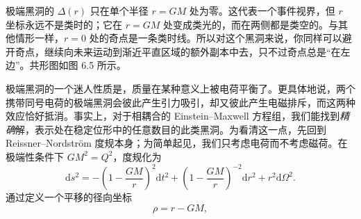 极端黑洞的 $\Delta(r)$ 只在单个半径 $r=GM$ 处为零。这代表一个事件视界，但 $r$ 坐标永远不是类时的；它在 $r=GM$ 处变成类光的，而在两侧都是类空的。与其他情形一样，$r=0$ 处的奇点是一条类时线。所以对这个黑洞来说，你同样可以避开奇点，继续向未来运动到渐近平直区域的额外副本中去，只不过奇点总是“在左边”。共形图如图 6.5 所示。

极端黑洞的一个迷人性质是，质量在某种意义上被电荷平衡了。更具体地说，两个携带同号电荷的极端黑洞会彼此产生引力吸引，却又彼此产生电磁排斥，而这两种效应恰好抵消。事实上，对于相耦合的 Einstein–Maxwell 方程组，我们能找到\emph{精确}解，表示处在稳定位形中的任意数目的此类黑洞。为看清这一点，先回到 Reissner–Nordström 度规本身；为简单起见，我们只考虑电荷而不考虑磁荷。在极端性条件下 $GM^{2}=Q^{2}$，度规化为
\begin{equation*}
\mathrm{d}s^{2} = -\left(1-\frac{GM}{r}\right)^{2}\mathrm{d}t^{2} + \left(1-\frac{GM}{r}\right)^{-2}\mathrm{d}r^{2} + r^{2}\mathrm{d}\Omega^{2}.
\tag{6.58}
\end{equation*}
通过定义一个平移的径向坐标
\begin{equation*}
\rho = r - GM,
\tag{6.59}
\end{equation*}

